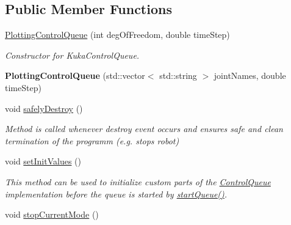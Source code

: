 \subsection*{Public Member Functions}
\begin{DoxyCompactItemize}
\item 
\hyperlink{classkukadu_1_1PlottingControlQueue_a5776d92fe9c9ebd49752be09333e732f}{Plotting\-Control\-Queue} (int deg\-Of\-Freedom, double time\-Step)
\begin{DoxyCompactList}\small\item\em Constructor for Kuka\-Control\-Queue. \end{DoxyCompactList}\item 
\hypertarget{classkukadu_1_1PlottingControlQueue_a49c262afda49f0659ba7a51d88677f35}{{\bfseries Plotting\-Control\-Queue} (std\-::vector$<$ std\-::string $>$ joint\-Names, double time\-Step)}\label{classkukadu_1_1PlottingControlQueue_a49c262afda49f0659ba7a51d88677f35}

\item 
void \hyperlink{classkukadu_1_1PlottingControlQueue_ae15b42e3d6b4b98bc2e470ff3ab3f7ea}{safely\-Destroy} ()
\begin{DoxyCompactList}\small\item\em Method is called whenever destroy event occurs and ensures safe and clean termination of the programm (e.\-g. stops robot) \end{DoxyCompactList}\item 
\hypertarget{classkukadu_1_1PlottingControlQueue_a6404b4ad14c35eaaf8d5afdf5ca271bb}{void \hyperlink{classkukadu_1_1PlottingControlQueue_a6404b4ad14c35eaaf8d5afdf5ca271bb}{set\-Init\-Values} ()}\label{classkukadu_1_1PlottingControlQueue_a6404b4ad14c35eaaf8d5afdf5ca271bb}

\begin{DoxyCompactList}\small\item\em This method can be used to initialize custom parts of the \hyperlink{classkukadu_1_1ControlQueue}{Control\-Queue} implementation before the queue is started by \hyperlink{classkukadu_1_1ControlQueue_a35d6a6e4e7c8467691c11567fe21f340}{start\-Queue()}. \end{DoxyCompactList}\item 
\hypertarget{classkukadu_1_1PlottingControlQueue_aa15ad1445f3b35e0d86a0e3f8b945ecb}{void \hyperlink{classkukadu_1_1PlottingControlQueue_aa15ad1445f3b35e0d86a0e3f8b945ecb}{stop\-Current\-Mode} ()}\label{classkukadu_1_1PlottingControlQueue_aa15ad1445f3b35e0d86a0e3f8b945ecb}


\end{DoxyCompactItemize}
